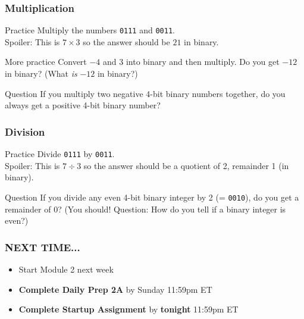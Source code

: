 \documentclass{beamer}
\begin{document}
\begin{frame}
    \frametitle{Multiplication}

    \begin{block}{Practice}
        Multiply the numbers \texttt{0111} and \texttt{0011}. \\

        Spoiler: This is $7 \times 3$ so the answer should be $21$ in binary. 
        
    \end{block}

    \begin{block}{More practice}
        Convert $-4$ and $3$ into binary and then multiply. Do you get $-12$ in binary? (What \emph{is} $-12$ in binary?)
    \end{block}

    \begin{block}{Question}
        If you multiply two negative 4-bit binary numbers together, do you always get a positive 4-bit binary number? 
    \end{block}
    

\end{frame}

\begin{frame}
    \frametitle{Division}

    \begin{block}{Practice}
        Divide \texttt{0111} by \texttt{0011}. \\

        Spoiler: This is $7 \div 3$ so the answer should be a quotient of 2, remainder 1 (in binary).
        
    \end{block}



    \begin{block}{Question}
        If you divide any even 4-bit binary integer by 2 (= \texttt{0010}), do you get a remainder of $0$? (You should! Question: How do you tell if a binary integer is even?)
    \end{block}
    

\end{frame}

\begin{frame}
    \frametitle{NEXT TIME...}

    \begin{itemize}
        \item Start Module 2 next week
        \item \textbf{Complete Daily Prep 2A} by Sunday 11:59pm ET 
        \item \textbf{Complete Startup Assignment} by \textbf{tonight} 11:59pm ET 
    \end{itemize}

\end{frame}
\end{document}
